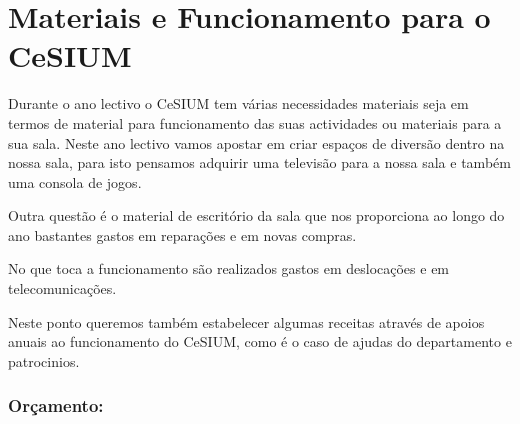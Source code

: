 \section{Materiais e Funcionamento para o CeSIUM}
Durante o ano lectivo o CeSIUM tem várias necessidades materiais seja em termos de material para funcionamento das suas actividades ou materiais para a sua sala. Neste ano lectivo vamos apostar em criar espaços de diversão dentro na nossa sala, para isto pensamos adquirir uma televisão para a nossa sala e também uma consola de jogos.

Outra questão é o material de escritório da sala que nos proporciona ao longo do ano bastantes gastos em reparações e em novas compras.

No que toca a funcionamento são realizados gastos em deslocações e em telecomunicações.

Neste ponto queremos também estabelecer algumas receitas através de apoios anuais ao funcionamento do CeSIUM, como é o caso de ajudas do departamento e patrocinios.


\subsubsection*{Orçamento:}

